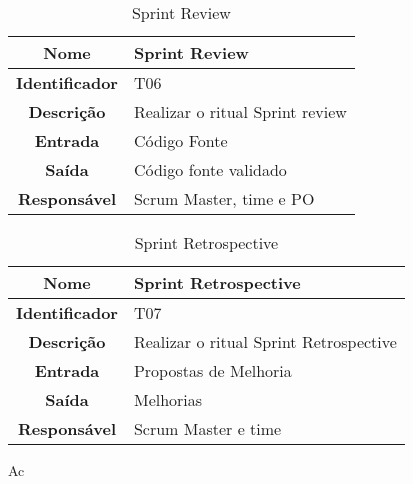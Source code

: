 {             \begin{table}[H]
                \centering
                \caption{Sprint Review}
                \begin{tabular}{c|p{10cm}}
                    \hline
                    \textbf{Nome}            & Sprint Review\\
                    \hline
                    \textbf{Identificador} & T06\\ 
                    \hline
                    \textbf{Descrição}   & Realizar o ritual Sprint review\\ 
                    \hline
                    \textbf{Entrada}           & Código Fonte\\
                    \hline
                    \textbf{Saída}            &  Código fonte validado\\
                    \hline
                    \textbf{Responsável}            & Scrum Master, time e PO\\
                    \hline                    
                \end{tabular}
            \end{table}

             \begin{table}[H]
                \centering
                \caption{Sprint Retrospective}
                \begin{tabular}{c|p{10cm}}
                    \hline
                    \textbf{Nome}            & Sprint Retrospective\\
                    \hline
                    \textbf{Identificador} & T07\\ 
                    \hline
                    \textbf{Descrição}   & Realizar o ritual Sprint Retrospective\\ 
                    \hline
                    \textbf{Entrada}           & Propostas de Melhoria\\
                    \hline
                    \textbf{Saída}            &  Melhorias\\
                    \hline
                    \textbf{Responsável}            & Scrum Master e  time \\
                    \hline                    
                \end{tabular}
            \end{table}
Ac
}



